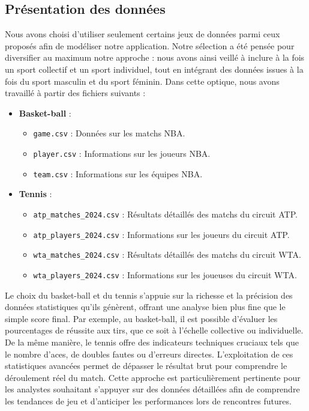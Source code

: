 \documentclass[
  french,
  letterpaper,
  DIV=11,
  numbers=noendperiod]{scrartcl}
\providecommand{\tightlist}{%
  \setlength{\itemsep}{0pt}\setlength{\parskip}{0pt}}
\begin{document}
\subsection{Présentation des
données}\label{pruxe9sentation-des-donnuxe9es}

Nous avons choisi d'utiliser seulement certains jeux de données parmi
ceux proposés afin de modéliser notre application. Notre sélection a été
pensée pour diversifier au maximum notre approche : nous avons ainsi
veillé à inclure à la fois un sport collectif et un sport individuel,
tout en intégrant des données issues à la fois du sport masculin et du
sport féminin. Dans cette optique, nous avons travaillé à partir des
fichiers suivants :

\begin{itemize}
\tightlist
\item
  \textbf{Basket-ball} :

  \begin{itemize}
  \tightlist
  \item
    \texttt{game.csv} : Données sur les matchs NBA.
  \item
    \texttt{player.csv} : Informations sur les joueurs NBA.
  \item
    \texttt{team.csv} : Informations sur les équipes NBA.
  \end{itemize}
\item
  \textbf{Tennis} :

  \begin{itemize}
  \tightlist
  \item
    \texttt{atp\_matches\_2024.csv} : Résultats détaillés des matchs du
    circuit ATP.
  \item
    \texttt{atp\_players\_2024.csv} : Informations sur les joueurs du
    circuit ATP.
  \item
    \texttt{wta\_matches\_2024.csv} : Résultats détaillés des matchs du
    circuit WTA.
  \item
    \texttt{wta\_players\_2024.csv} : Informations sur les joueuses du
    circuit WTA.
  \end{itemize}
\end{itemize}

Le choix du basket-ball et du tennis s'appuie sur la richesse et la
précision des données statistiques qu'ils génèrent, offrant une analyse
bien plus fine que le simple score final. Par exemple, au basket-ball,
il est possible d'évaluer les pourcentages de réussite aux tirs, que ce
soit à l'échelle collective ou individuelle. De la même manière, le
tennis offre des indicateurs techniques cruciaux tels que le nombre
d'aces, de doubles fautes ou d'erreurs directes. L'exploitation de ces
statistiques avancées permet de dépasser le résultat brut pour
comprendre le déroulement réel du match. Cette approche est
particulièrement pertinente pour les analystes souhaitant s'appuyer sur
des données détaillées afin de comprendre les tendances de jeu et
d'anticiper les performances lors de rencontres futures.
\end{document}
